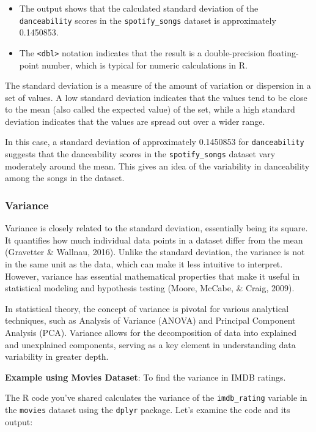 \documentclass[
]{book}
\providecommand{\tightlist}{%
  \setlength{\itemsep}{0pt}\setlength{\parskip}{0pt}}
\begin{document}
\begin{itemize}
\tightlist
\item
  The output shows that the calculated standard deviation of the \texttt{danceability} scores in the \texttt{spotify\_songs} dataset is approximately 0.1450853.
\item
  The \texttt{\textless{}dbl\textgreater{}} notation indicates that the result is a double-precision floating-point number, which is typical for numeric calculations in R.
\end{itemize}

The standard deviation is a measure of the amount of variation or dispersion in a set of values. A low standard deviation indicates that the values tend to be close to the mean (also called the expected value) of the set, while a high standard deviation indicates that the values are spread out over a wider range.

In this case, a standard deviation of approximately 0.1450853 for \texttt{danceability} suggests that the danceability scores in the \texttt{spotify\_songs} dataset vary moderately around the mean. This gives an idea of the variability in danceability among the songs in the dataset.

\hypertarget{variance}{%
\subsubsection*{Variance}\label{variance}}

Variance is closely related to the standard deviation, essentially being its square. It quantifies how much individual data points in a dataset differ from the mean (Gravetter \& Wallnau, 2016). Unlike the standard deviation, the variance is not in the same unit as the data, which can make it less intuitive to interpret. However, variance has essential mathematical properties that make it useful in statistical modeling and hypothesis testing (Moore, McCabe, \& Craig, 2009).

In statistical theory, the concept of variance is pivotal for various analytical techniques, such as Analysis of Variance (ANOVA) and Principal Component Analysis (PCA). Variance allows for the decomposition of data into explained and unexplained components, serving as a key element in understanding data variability in greater depth.

\textbf{Example using Movies Dataset}: To find the variance in IMDB ratings.

The R code you've shared calculates the variance of the \texttt{imdb\_rating} variable in the \texttt{movies} dataset using the \texttt{dplyr} package. Let's examine the code and its output:
\end{document}
